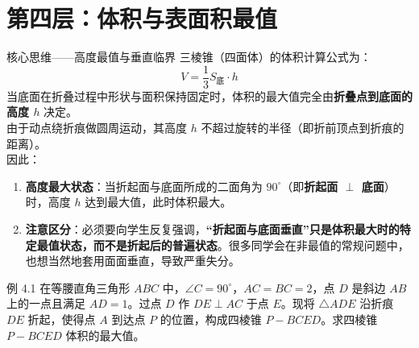 \documentclass[11pt,a4paper]{ctexart}
\begin{document}
\newpage

\section{第四层：体积与表面积最值}

\begin{keybox}{核心思维——高度最值与垂直临界}
三棱锥（四面体）的体积计算公式为：
\[ V = \frac{1}{3} S_{\text{底}} \cdot h \]
当底面在折叠过程中形状与面积保持固定时，体积的最大值完全由\textbf{折叠点到底面的高度 $h$} 决定。\\
由于动点绕折痕做圆周运动，其高度 $h$ 不超过旋转的半径（即折前顶点到折痕的距离）。\\
因此：
\begin{enumerate}[label=\arabic*. , leftmargin=2em, itemsep=0.1em]
  \item \textbf{高度最大状态}：当折起面与底面所成的二面角为 $90^\circ$（即\textbf{折起面 $\perp$ 底面}）时，高度 $h$ 达到最大值，此时体积最大。
  \item \textbf{注意区分}：必须要向学生反复强调，\textbf{“折起面与底面垂直”只是体积最大时的特定最值状态，而不是折起后的普遍状态}。很多同学会在非最值的常规问题中，也想当然地套用面面垂直，导致严重失分。
\end{enumerate}
\end{keybox}

\begin{exbox}{例 4.1}
在等腰直角三角形 $ABC$ 中，$\angle C = 90^\circ$，$AC = BC = 2$，点 $D$ 是斜边 $AB$ 上的一点且满足 $AD = 1$。过点 $D$ 作 $DE \perp AC$ 于点 $E$。现将 $\triangle ADE$ 沿折痕 $DE$ 折起，使得点 $A$ 到达点 $P$ 的位置，构成四棱锥 $P-BCED$。求四棱锥 $P-BCED$ 体积的最大值。
\end{exbox}
\end{document}
